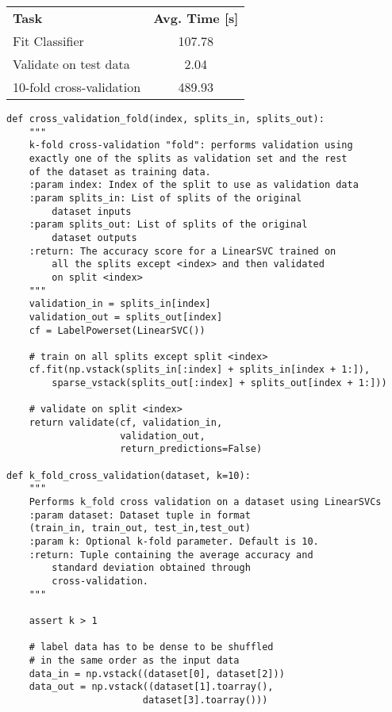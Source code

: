 \documentclass{kthreport}
\theoremstyle{definition}
\begin{document}
\begin{table}
    \centering
    \begin{tabular}{|l|c|}
        \hline
        \textbf{Task} & \textbf{Avg. Time [s]}\\ 
        Fit Classifier & 107.78 \\ 
        Validate on test data & 2.04 \\ 
        10-fold cross-validation & 489.93 \\ 
        \hline 
    \end{tabular} 
\end{table}

\printbibliography
\newpage
\begin{lstlisting}[style=MyPython, caption={Extract of the k-fold cross-validation subroutines.}, label={lst:kfoldcv}]
def cross_validation_fold(index, splits_in, splits_out):
	"""
	k-fold cross-validation "fold": performs validation using 
    exactly one of the splits as validation set and the rest 
    of the dataset as training data.
	:param index: Index of the split to use as validation data
	:param splits_in: List of splits of the original 
        dataset inputs
	:param splits_out: List of splits of the original 
        dataset outputs
	:return: The accuracy score for a LinearSVC trained on 
        all the splits except <index> and then validated 
        on split <index>
	"""
	validation_in = splits_in[index]
	validation_out = splits_out[index]
	cf = LabelPowerset(LinearSVC())
	
	# train on all splits except split <index>
	cf.fit(np.vstack(splits_in[:index] + splits_in[index + 1:]),
		sparse_vstack(splits_out[:index] + splits_out[index + 1:]))
	
	# validate on split <index>
	return validate(cf, validation_in, 
                    validation_out, 
                    return_predictions=False)

def k_fold_cross_validation(dataset, k=10):
	"""
	Performs k_fold cross validation on a dataset using LinearSVCs
	:param dataset: Dataset tuple in format 
    (train_in, train_out, test_in,test_out)
	:param k: Optional k-fold parameter. Default is 10.
	:return: Tuple containing the average accuracy and 
        standard deviation obtained through 
        cross-validation.
	"""
	
	assert k > 1
	
	# label data has to be dense to be shuffled
	# in the same order as the input data
	data_in = np.vstack((dataset[0], dataset[2]))
	data_out = np.vstack((dataset[1].toarray(),
                        dataset[3].toarray()))
	

\end{lstlisting}
\end{document}
